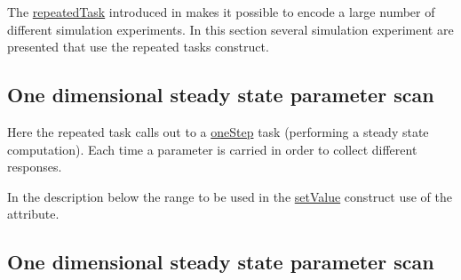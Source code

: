 The \hyperref[class:repeatedTask]{repeatedTask} introduced in \LoneVtwo makes it possible to encode a large number of different simulation experiments. In this section several simulation experiment are presented that use the repeated tasks construct. 

\subsection{One dimensional steady state parameter scan}
Here the repeated task calls out to a \hyperref[class:oneStep]{oneStep} task (performing a steady state computation). Each time a parameter is carried in order to collect different responses. 


In the description below the range to be used in the \hyperref[class:setValue]{setValue} construct use of the  attribute.



\subsection{One dimensional steady state parameter scan}